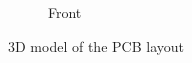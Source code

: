\begin{figure}[ht]
\begin{subfigure}[b]{0.49\textwidth}
    \caption{Front}
    \label{fig:pcb:front}
  \end{subfigure}
  \caption{3D model of the PCB layout}
  \label{fig:pcb}
\end{figure}
%